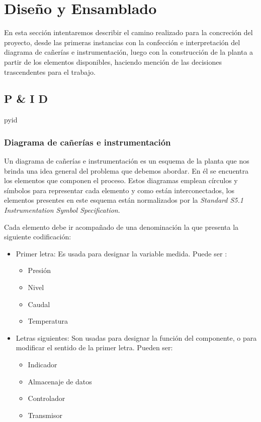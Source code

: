 \chapter{Diseño y Ensamblado}
\label{ch:DisenoEnsamblado}
En esta sección intentaremos describir el camino realizado para la concreción del proyecto, desde 
las primeras instancias con la confección e interpretación del diagrama de cañerías e instrumentación, 
luego con la construcción de la planta a partir de los elementos disponibles, haciendo mención de 
las decisiones trascendentes para el trabajo.

\section{P \& I D}
\label{sec:p&id}

\gls{pyid}

\subsection{Diagrama de cañerías e instrumentación}
Un diagrama de cañerías e instrumentación es un esquema de la planta que nos brinda una idea 
general del problema que debemos abordar. En él se encuentra los elementos que componen el proceso. 
Estos diagramas emplean círculos y símbolos para representar cada elemento y como están interconectados, 
los elementos presentes en este esquema están normalizados por la \emph{Standard S5.1
Instrumentation Symbol Specification}.

Cada elemento debe ir acompañado de una denominación la que presenta la siguiente codificación:


\begin{itemize}  
 \item Primer letra: 
 Es usada para designar la variable medida. Puede ser :
 \begin{itemize}
  \item Presión
  \item Nivel
  \item Caudal
  \item Temperatura
 \end{itemize}

 \item Letras siguientes:
 Son usadas para designar la función del componente, o para modificar el sentido de la primer letra.
 Pueden ser:
 \begin{itemize}
  \item Indicador
  \item Almacenaje de datos
  \item Controlador
  \item Transmisor
 \end{itemize}
\end{itemize}

